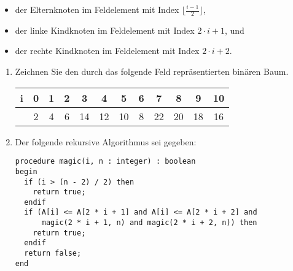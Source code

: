 \documentclass{bschlangaul-aufgabe}
\begin{document}
\begin{itemize}
\item der Elternknoten im Feldelement mit Index $\lfloor\frac{i-1}{2}\rfloor$,

\item der linke Kindknoten im Feldelement mit Index $2 \cdot i + 1$, und

\item der rechte Kindknoten im Feldelement mit Index $2 \cdot i + 2$.
\end{itemize}
\begin{enumerate}


\item Zeichnen Sie den durch das folgende Feld repräsentierten binären
Baum.

\begin{center}
\begin{tabular}{|r|c|c|c|c|c|c|c|c|c|c|c|}
\hline
i        & 0 & 1 & 2 & 3  & 4  & 5  & 6 & 7  & 8  & 9  & 10\\\hline
\p{A[i]} & 2 & 4 & 6 & 14 & 12 & 10 & 8 & 22 & 20 & 18 & 16\\\hline
\end{tabular}
\end{center}

\begin{bAntwort}
\begin{center}
\end{center}
\end{bAntwort}


\item Der folgende rekursive Algorithmus sei gegeben:


\begin{verbatim}
procedure magic(i, n : integer) : boolean
begin
  if (i > (n - 2) / 2) then
    return true;
  endif
  if (A[i] <= A[2 * i + 1] and A[i] <= A[2 * i + 2] and
      magic(2 * i + 1, n) and magic(2 * i + 2, n)) then
    return true;
  endif
  return false;
end
\end{verbatim}



\end{enumerate}
\end{document}
